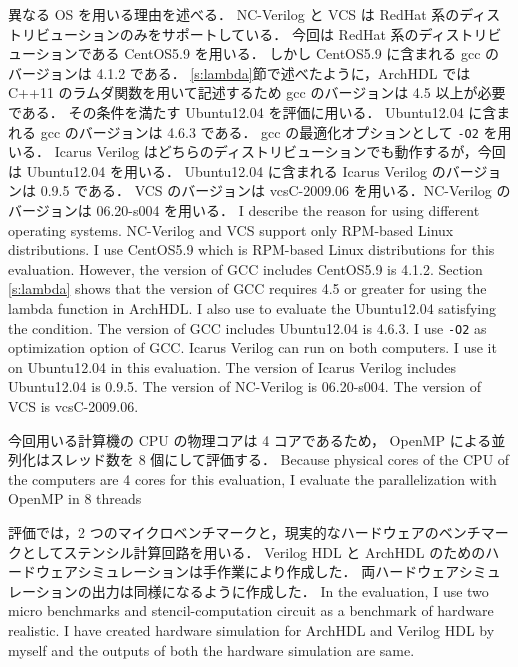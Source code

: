 異なる OS を用いる理由を述べる．
NC-Verilog と VCS は RedHat 系のディストリビューションのみをサポートしている．
今回は RedHat 系のディストリビューションである CentOS5.9 を用いる．
しかし CentOS5.9 に含まれる gcc のバージョンは 4.1.2 である．
\ref{s:lambda}節で述べたように，ArchHDL では C++11 のラムダ関数を用いて記述するため gcc のバージョンは 4.5 以上が必要である．
その条件を満たす Ubuntu12.04 を評価に用いる．
Ubuntu12.04 に含まれる gcc のバージョンは 4.6.3 である．
gcc の最適化オプションとして \verb/-O2/ を用いる．
Icarus Verilog はどちらのディストリビューションでも動作するが，今回は Ubuntu12.04 を用いる．
Ubuntu12.04 に含まれる Icarus Verilog のバージョンは 0.9.5 である．
VCS のバージョンは vcsC-2009.06 を用いる．NC-Verilog のバージョンは 06.20-s004 を用いる．
\fi
I describe the reason for using different operating systems.
NC-Verilog and VCS support only RPM-based Linux distributions.
I use CentOS5.9 which is RPM-based Linux distributions for this evaluation.
However, the version of GCC includes CentOS5.9 is 4.1.2.
Section \ref{s:lambda} shows that the version of GCC requires 4.5 or greater for using the lambda function in ArchHDL.
I also use to evaluate the Ubuntu12.04 satisfying the condition.
The version of GCC includes Ubuntu12.04 is 4.6.3.
I use \verb/-O2/ as optimization option of GCC.
Icarus Verilog can run on both computers.
I use it on Ubuntu12.04 in this evaluation.
The version of Icarus Verilog includes Ubuntu12.04 is 0.9.5.
The version of NC-Verilog is 06.20-s004.
The version of VCS is vcsC-2009.06.

今回用いる計算機の CPU の物理コアは 4 コアであるため， OpenMP による並列化はスレッド数を 8 個にして評価する．
\fi
Because physical cores of the CPU of the computers are 4 cores for this evaluation,
I evaluate the parallelization with OpenMP in 8 threads

評価では，2 つのマイクロベンチマークと，現実的なハードウェアのベンチマークとしてステンシル計算回路\cite{koba:stencil}を用いる．
Verilog HDL と ArchHDL のためのハードウェアシミュレーションは手作業により作成した．
両ハードウェアシミュレーションの出力は同様になるように作成した．
\fi
In the evaluation, I use two micro benchmarks
and stencil-computation circuit as a benchmark of hardware realistic.
I have created hardware simulation for ArchHDL and Verilog HDL by myself
and the outputs of both the hardware simulation are same.

